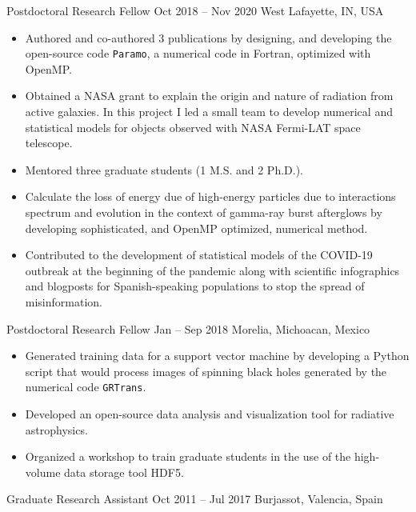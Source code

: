 \cventry{}%
{\Purdue}%
{Postdoctoral Research Fellow}%
{Oct 2018 -- Nov 2020}%
{West Lafayette, IN, USA}%
{%
\begin{itemize}
	\item Authored and co-authored 3 publications by designing, and developing the open-source code \texttt{Paramo}, a numerical code in Fortran, optimized with OpenMP.
	\item Obtained a NASA grant to explain the origin and nature of radiation from active galaxies. In this project I led a small team to develop numerical and statistical models for objects observed with NASA Fermi-LAT space telescope.
	\item Mentored three graduate students (1 M.S. and 2 Ph.D.).
	\item Calculate the loss of energy due of high-energy particles due to interactions spectrum and evolution in the context of gamma-ray burst afterglows by developing sophisticated, and OpenMP optimized, numerical method.
	\item Contributed to the development of statistical models of the COVID-19 outbreak at the beginning of the pandemic along with scientific infographics and blogposts for Spanish-speaking populations to stop the spread of misinformation.
\end{itemize}
}
\cventry{}%
{\UMSNHes}%
{Postdoctoral Research Fellow}%
{\hspace{-30ex}Jan -- Sep 2018}%
{Morelia, Michoacan, Mexico}%
{%
\begin{itemize}
	\item Generated training data for a support vector machine by developing a Python script that would process images of spinning black holes generated by the numerical code \texttt{GRTrans}.
	\item Developed an open-source data analysis and visualization tool for radiative astrophysics.
	\item Organized a workshop to train graduate students in the use of the high-volume data storage tool HDF5.
\end{itemize}
}
\cventry{}%
{\UVval}%
{Graduate Research Assistant}%
{Oct 2011 -- Jul 2017}%
{Burjassot, Valencia, Spain}%
